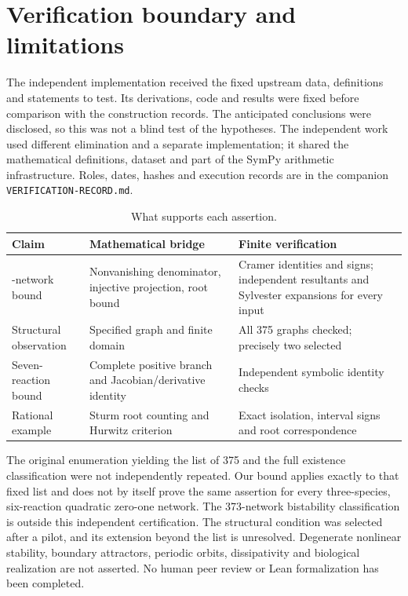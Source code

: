 \documentclass[11pt,a4paper]{article}
\begin{document}
\section{Verification boundary and limitations}\label{sec:scope}
The independent implementation received the fixed upstream data,
definitions and statements to test. Its derivations, code and
results were fixed before comparison with the construction
records. The anticipated conclusions were disclosed, so this was
not a blind test of the hypotheses. The independent work used
different elimination and a separate implementation; it shared
the mathematical definitions, dataset and part of the SymPy
arithmetic infrastructure. Roles, dates, hashes and execution
records are in the companion \texttt{VERIFICATION-RECORD.md}.

\begin{table}[ht]
\centering\small
\begin{tabularx}{\linewidth}{@{}>{\raggedright\arraybackslash}p{30mm}YY@{}}
\toprule
Claim & Mathematical bridge & Finite verification\\
-network bound & Nonvanishing denominator, injective
projection, root bound & Cramer identities and signs;
independent resultants and Sylvester expansions for every input\\
Structural observation & Specified graph and finite domain &
All 375 graphs checked; precisely two selected\\
Seven-reaction bound & Complete positive branch and
Jacobian/derivative identity & Independent symbolic identity checks\\
Rational example & Sturm root counting and Hurwitz criterion &
Exact isolation, interval signs and root correspondence\\
\bottomrule
\end{tabularx}
\caption{What supports each assertion.}
\end{table}

The original enumeration yielding the list of 375 and the full
existence classification were not independently repeated. Our
bound applies exactly to that fixed list and does not by itself
prove the same assertion for every three-species, six-reaction
quadratic zero-one network. The 373-network bistability
classification is outside this independent certification.
The structural condition was selected after a pilot, and its
extension beyond the list is unresolved. Degenerate nonlinear
stability, boundary attractors, periodic orbits, dissipativity
and biological realization are not asserted. No human peer
review or Lean formalization has been completed.
\end{document}
